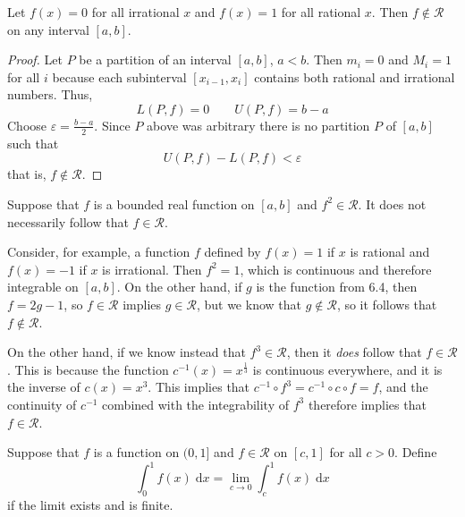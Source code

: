 \documentclass{homework}
\begin{document}
	
	
	Let $f(x) = 0$ for all irrational $x$ and $f(x) = 1$ for all rational $x$. Then $f \notin \mathscr{R}$ on any interval $[a,b]$.
	
	\begin{proof}
		Let $P$ be a partition of an interval $[a,b]$, $a< b$. Then $m_i = 0$ and $M_i =1$ for all $i$ because each subinterval $[x_{i-1},x_i]$ contains both rational and irrational numbers. Thus,
		$$
		L(P,f) = 0 \qquad U(P,f)=b-a
		$$
		Choose $\varepsilon = \frac{b-a}{2}$. Since $P$ above was arbitrary there is no partition $P$ of $[a,b]$ such that
		$$
		U(P,f) - L(P,f) < \varepsilon
		$$that is, $f \notin \mathscr{R}$.
	\end{proof}
	
	
	Suppose that $f$ is a bounded real function on $[a,b]$ and $f^2 \in \mathscr{R}$. It does not necessarily follow that $f \in \mathscr{R}$.
	
	Consider, for example, a function $f$ defined by $f(x) = 1$ if $x$ is rational and $f(x) = -1$ if $x$ is irrational. Then $f^2 = 1$, which is continuous and therefore integrable on $[a,b]$. On the other hand, if $g$ is the function from 6.4, then $f = 2 g - 1$, so $f \in \mathscr{R}$ implies $g \in\mathscr{R}$, but we know that $g \notin\mathscr{R}$, so it follows that $f \notin\mathscr{R}$.
	
	On the other hand, if we know instead that $f^3 \in \mathscr{R}$, then it \textit{does} follow that $f \in \mathscr{R}$. This is because the function $c^{-1}(x) = x^{\frac{1}{3}}$ is continuous everywhere, and it is the inverse of $c(x) = x^3$. This implies that $c^{-1}\circ f^3 = c^{-1}\circ c \circ f = f$, and the continuity of $c^{-1}$ combined with the integrability of $f^3$ therefore implies that $f \in \mathscr{R}$.
	
	
	Suppose that $f$ is a function on $(0, 1]$ and $f \in \mathscr{R}$ on $[c, 1]$ for all $c > 0$. Define
	$$
	\int_0^1f(x)\;\text{d}x = \lim_{c\to0}\int_c^1f(x)\;\text{d}x
	$$
	if the limit exists and is finite.
	
\end{document}
